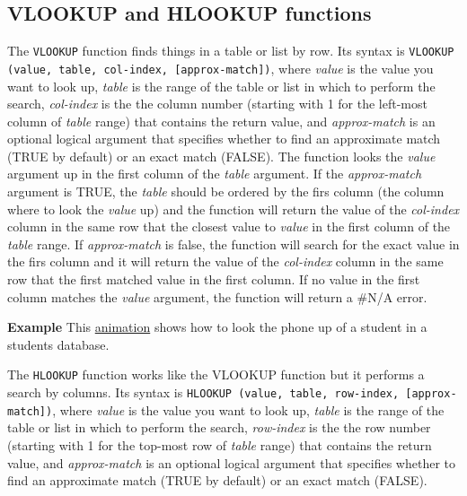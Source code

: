 \subsection{VLOOKUP and HLOOKUP functions}\hypertarget{vlookup-and-hlookup-functions}{}\label{vlookup-and-hlookup-functions}

The \texttt{VLOOKUP} function finds things in a table or list by row. Its syntax is \texttt{VLOOKUP (value, table, col-index, [approx-match])}, where \emph{value} is the value you want to look up, \emph{table} is the range of the table or list in which to perform the search, \emph{col-index} is the the column number (starting with 1 for the left-most column of \emph{table} range) that contains the return value, and \emph{approx-match} is an optional logical argument that specifies whether to find an approximate match (TRUE by default) or an exact match (FALSE). The function looks the \emph{value} argument up in the first column of the \emph{table} argument. If the \emph{approx-match} argument is TRUE, the \emph{table} should be ordered by the firs column (the column where to look the \emph{value} up) and the function will return the value of the \emph{col-index} column in the same row that the closest value to \emph{value} in the first column of the \emph{table} range. If \emph{approx-match} is false, the function will search for the exact value in the firs column and it will return the value of the \emph{col-index} column in the same row that the first matched value in the first column. If no value in the first column matches the \emph{value} argument, the function will return a \#N/A error.

\textbf{Example} This \href{http://aprendeconalf.es/office/excel/manual/img/example_function_vlookup.gif}{animation} shows how to look the phone up of a student in a students database.

The \texttt{HLOOKUP} function works like the VLOOKUP function but it performs a search by columns. Its syntax is \texttt{HLOOKUP (value, table, row-index, [approx-match])}, where \emph{value} is the value you want to look up, \emph{table} is the range of the table or list in which to perform the search, \emph{row-index} is the the row number (starting with 1 for the top-most row of \emph{table} range) that contains the return value, and \emph{approx-match} is an optional logical argument that specifies whether to find an approximate match (TRUE by default) or an exact match (FALSE).

